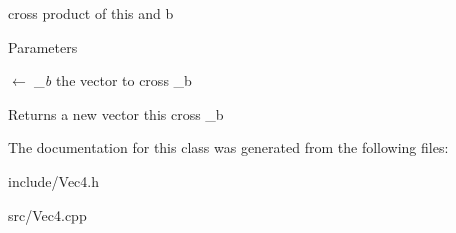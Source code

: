 cross product of this and b 
\begin{DoxyParams}{Parameters}
\item[\mbox{$\leftarrow$} {\em \_\-b}]the vector to cross \_\-b \end{DoxyParams}
\begin{DoxyReturn}{Returns}
a new vector this cross \_\-b 
\end{DoxyReturn}


The documentation for this class was generated from the following files:\begin{DoxyCompactItemize}
\item 
include/Vec4.h\item 
src/Vec4.cpp\end{DoxyCompactItemize}
